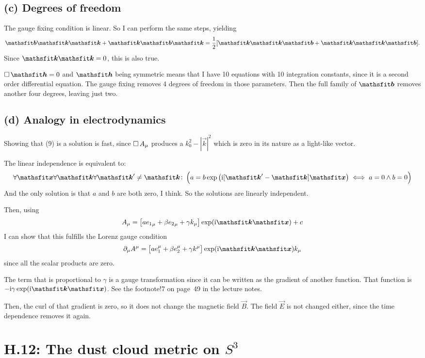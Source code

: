 \subsection*{(c) Degrees of freedom}

The gauge fixing condition is linear. So I can perform the same steps, yielding
\[
    \tens b \tens k \tens k + \tens k \tens b \tens k = \frac12[ \tens k \tens
    k \tens b + \tens k \tens k \tens b].
\]
Since $\tens k \tens k = 0$, this is also true.

$\dalambert \tens h = 0$ and $\tens h$ being symmetric means that I have 10
equations with 10 integration constants, since it is a second order
differential equation. The gauge fixing removes 4 degrees of freedom in
those parameters. Then the full family of $\tens b$ removes another four
degrees, leaving just two.

\subsection*{(d) Analogy in electrodynamics}

Showing that (9) is a solution is fast, since $\operatorname{\Box} A_\mu$ produces a
$k_0^2 - |\vec k|^2$ which is zero in its nature as a light-like vector.

The linear independence is equivalent to:
\[
    \forall \tens x \forall \tens k \forall \tens k' \neq \tens k \colon \del{a = b \exp\del{\iup [\tens k' - \tens k] \tens x} \iff
        a = 0 \land b = 0
    }
\]
And the only solution is that $a$ and $b$ are both zero, I think. So the
solutions are linearly independent.

Then, using
\[
    A_\mu = \sbr{a {e_1}_\mu + \beta {e_2}_\mu + \gamma k_\mu} \exp(\iup \tens
    k \tens x) + c
\]
I can show that this fulfills the Lorenz gauge condition
\[
    \partial_\mu A^\mu = \sbr{a e_1^\mu + \beta e_2^\mu + \gamma k^\mu} \exp(\iup \tens
    k \tens x) k_\mu
\]
since all the scalar products are zero.

The term that is proportional to $\gamma$ is a gauge transformation since it
can be written as the gradient of another function. That function is $- \iup
\gamma \exp(\iup \tens k \tens x)$. See the footnote!7 on page~49 in the
lecture notes.

Then, the curl of that gradient is zero, so it does not change the magnetic
field $\vec B$. The field $\vec E$ is not changed either, since the time
dependence removes it again.

\section*{H.12: The dust cloud metric on $S^3$}

